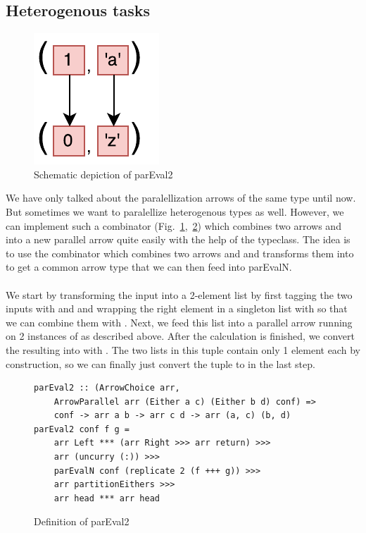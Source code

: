 \subsection{Heterogenous tasks}
\begin{figure}[h]
	\includegraphics[scale=0.7]{images/parEval2}
	\caption{Schematic depiction of parEval2}
	\label{fig:parEval2Img}
\end{figure}
We have only talked about the paralellization arrows of the same type until now. But sometimes we want to paralellize heterogenous types as well. However, we can implement such a  combinator (Fig.~\ref{fig:parEval2Img},~\ref{fig:parEval2}) which combines two arrows  and  into a new parallel arrow  quite easily with the help of the  typeclass. The idea is to use the \code{+++} combinator which combines two arrows  and  and transforms them into  to get a common arrow type that we can then feed into parEvalN.
\\\\
We start by transforming the  input into a 2-element list \code{[Either a c]} by first tagging the two inputs with  and  and wrapping the right element in a singleton list with  so that we can combine them with . Next, we feed this list into a parallel arrow running on 2 instances of  as described above. After the calculation is finished, we convert the resulting \code{[Either b d]} into \code{([b], [d])} with . The two lists in this tuple contain only 1 element each by construction, so we can finally just convert the tuple to  in the last step.
\begin{figure}[h]
\begin{lstlisting}[frame=htrbl]
parEval2 :: (ArrowChoice arr,
	ArrowParallel arr (Either a c) (Either b d) conf) =>
	conf -> arr a b -> arr c d -> arr (a, c) (b, d)
parEval2 conf f g = 
	arr Left *** (arr Right >>> arr return) >>>
	arr (uncurry (:)) >>>
	parEvalN conf (replicate 2 (f +++ g)) >>>
	arr partitionEithers >>>
	arr head *** arr head
\end{lstlisting}
	\caption{Definition of parEval2}
	\label{fig:parEval2}
\end{figure}


